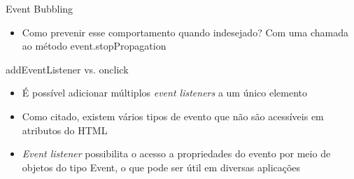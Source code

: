 \begin{frame}{Event Bubbling}
  \begin{itemize}
    \item Como prevenir esse comportamento quando indesejado? Com uma chamada ao
          método event.stopPropagation
  \end{itemize}
  \begin{figure}
    \centering
  \end{figure}
  \begin{figure}
    \centering
  \end{figure}
\end{frame}

\begin{frame}{addEventListener vs. onclick}
  \begin{itemize}
    \item É possível adicionar múltiplos \textit{event listeners} a um único
          elemento
    \item Como citado, existem vários tipos de evento que não são acessíveis em
          atributos do HTML
    \item \textit{Event listener} possibilita o acesso a propriedades do evento
          por meio de objetos do tipo Event, o que pode ser útil em diversas
          aplicações
  \end{itemize}
\end{frame}

